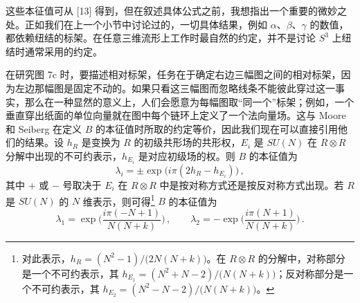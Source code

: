 \documentclass[11pt,a4paper]{article}
\begin{document}
这些本征值可从 [13] 得到，但在叙述具体公式之前，我想指出一个重要的微妙之处。正如我们在上一个小节中讨论过的，一切具体结果，例如 $\alpha$、$\beta$、$\gamma$ 的数值，都依赖纽结的标架。在任意三维流形上工作时最自然的约定，并不是讨论 $S^3$ 上纽结时通常采用的约定。

在研究图 7c 时，要描述相对标架，任务在于确定右边三幅图之间的相对标架，因为左边那幅图是固定不动的。如果只看这三幅图而忽略线条不能彼此穿过这一事实，那么在一种显然的意义上，人们会愿意为每幅图取“同一个”标架；例如，一个垂直穿出纸面的单位向量就在图中每个链环上定义了一个法向量场。这与 Moore 和 Seiberg 在定义 $B$ 的本征值时所取的约定等价，因此我们现在可以直接引用他们的结果。设 $h_R$ 是变换为 $R$ 的初级共形场的共形权，$E_i$ 是 $SU(N)$ 在 $R\otimes R$ 分解中出现的不可约表示，$h_{E_i}$ 是对应初级场的权。则 $B$ 的本征值为
\begin{equation}
    \lambda_i = \pm\exp\bigl(i\pi(2h_R - h_{E_i})\bigr)\,,
    \tag{4.18}
\end{equation}
其中 $+$ 或 $-$ 号取决于 $E_i$ 在 $R\otimes R$ 中是按对称方式还是按反对称方式出现。若 $R$ 是 $SU(N)$ 的 $N$ 维表示，则可得\footnote{对此表示，$h_R=(N^2-1)/\bigl(2N(N+k)\bigr)$。在 $R\otimes R$ 的分解中，对称部分是一个不可约表示，其 $h_{E_1}=(N^2+N-2)/\bigl(N(N+k)\bigr)$；反对称部分是一个不可约表示，其 $h_{E_2}=(N^2-N-2)/\bigl(N(N+k)\bigr)$。} $B$ 的本征值为
\begin{equation}
    \lambda_1 = \exp\biggl(\frac{i\pi(-N+1)}{N(N+k)}\biggr)\,,
    \qquad
    \lambda_2 = -\exp\biggl(\frac{i\pi(N+1)}{N(N+k)}\biggr)\,.
    \tag{4.19}
\end{equation}



\end{document}
